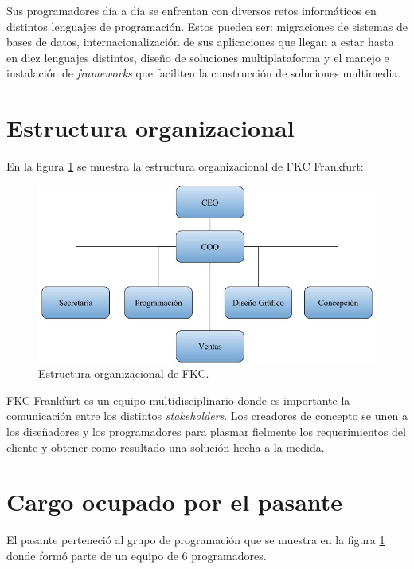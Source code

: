 Sus programadores día a día se enfrentan con diversos retos informáticos en distintos lenguajes de programación. Estos pueden ser: migraciones de sistemas de bases de datos, internacionalización de sus aplicaciones que llegan a estar hasta en diez lenguajes distintos, diseño de soluciones multiplataforma y el manejo e instalación de \emph{frameworks} que faciliten la construcción de soluciones multimedia.

\section{Estructura organizacional}

En la figura \ref{fig:estructuraFKC} se muestra la estructura organizacional de \gls{FKC} Frankfurt:

\begin{figure}[h]
\begin{center}
	\includegraphics[width=\textwidth]{figuras/estructuraFKC.jpg}
	\caption{Estructura organizacional de \gls{FKC}.} \label{fig:estructuraFKC}
\end{center}
\end{figure}

\gls{FKC} Frankfurt es un equipo multidisciplinario donde es importante la comunicación entre los distintos \emph{stakeholders}. Los creadores de concepto se unen a los diseñadores y los programadores para plasmar fielmente los requerimientos del cliente y obtener como resultado una solución hecha a la medida.

\section{Cargo ocupado por el pasante} 

El pasante perteneció al grupo de programación que se muestra en la figura \ref{fig:estructuraFKC} donde formó parte de un equipo de 6 programadores.



